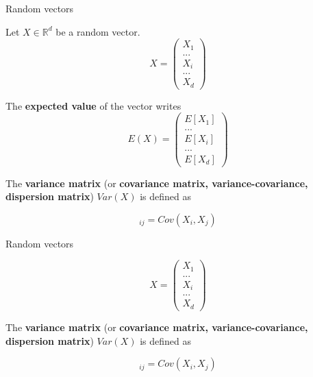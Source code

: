 \documentclass[usenames,dvipsnames]{beamer}
\begin{document}
\begin{frame}{Random vectors}
\begin{definition} 
    Let $X\in \mathbb{R}^d$ be a random vector.
\begin{equation*}
X=\begin{pmatrix}
X_{1}\\
...\\
X_{i}\\
...\\
X_{d}
\end{pmatrix}
\end{equation*}

The \textbf{{expected value}} of the vector writes
\begin{equation*}
    E(X)=\begin{pmatrix}
    E[X_{1}]\\
...\\
    E[X_{i}]\\
...\\
    E[X_{d}]
\end{pmatrix}
\end{equation*}

    The \textbf{{variance matrix}} (or \textbf{{covariance matrix, variance-covariance, dispersion matrix}})  $Var(X)$ is defined as

    \begin{equation*}
	[Var(X)]_{ij} = Cov(X_i, X_j)       
    \end{equation*}
\end{definition}
\end{frame}

\begin{frame}{Random vectors}
\begin{definition}

\begin{equation*}
X=\begin{pmatrix}
X_{1}\\
...\\
X_{i}\\
...\\
X_{d}
\end{pmatrix}
\end{equation*}

    The \textbf{{variance matrix}} (or \textbf{{covariance matrix, variance-covariance, dispersion matrix}})  $Var(X)$ is defined as

    \begin{equation*}
	[Var(X)]_{ij} = Cov(X_i, X_j)       
    \end{equation*}
\end{definition}
\end{frame}
\end{document}

